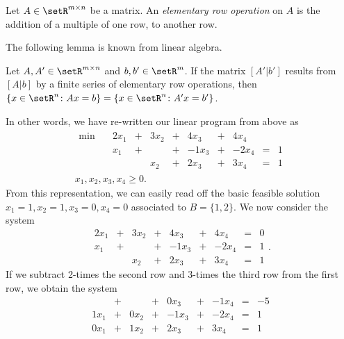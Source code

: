 \begin{definition}
  \label{def:14}
  Let $A\in \setR^{m\times n}$ be a matrix. An \emph{elementary row operation}
  on $A$ is the addition of a multiple of one row, to another row. 
\end{definition}

The following lemma is known from linear algebra. 
\begin{lemma}
  \label{lem:12}
  Let $A,A' \in \setR^{m\times n}$ and $b , b' \in \setR^m$. If the matrix
  $\left[A'|b'\right]$ results from  $\left[A|b\right]$ by a finite
  series of elementary row operations, then  $\{x \in  \setR^n \colon Ax=b\} =
  \{x \in  \setR^n \colon A'x=b'\}$. 
\end{lemma}

\noindent 
In other words, we have re-written our linear program from above as 
\begin{displaymath}
 \begin{array}{r}
  \begin{matrix}               
    \min \quad  & 2 x_1 & + & 3 x_2 & +&  4 x_3 & +&  4 x_4  & & \\
 &      x_1   & + &     & + & -1 x_3 & + & -2x_4 & = & 1    
    \\                          
&    &   &  x_2 & + & 2 x_3 & + & 3 x_4 & =&  1 
  \end{matrix} \\
  x_1,x_2,x_3,x_4 \geq0. 
\end{array}
\end{displaymath}  
From this representation, we can easily read off the basic feasible
solution $x_1=1, x_2=1, x_3 = 0, x_4 = 0$ associated to $B =
\{1,2\}$. We now consider the system
\begin{displaymath}
   \begin{matrix}               
    2 x_1 & + & 3 x_2 & +&  4 x_3 & +&  4 x_4  & =  & 0 \\
    \hline
      x_1   & + &     & + & -1 x_3 & + & -2x_4 & = & 1    
    \\                          
    &   &  x_2 & + & 2 x_3 & + & 3 x_4 & =&  1 
  \end{matrix}. 
\end{displaymath}
If we subtract 2-times the second row and 3-times the third row from
the first row, we obtain the system 
\begin{displaymath}
  \begin{matrix}    
 & + &       & + &     0 x_3 & + &    -1x_4 & = &
-5\\ \hline 
1  x_1 & + &    0 x_2 & + &   -1x_3 & + &    -2 x_4 & = &    1\\
     0x_1 & + &     1x_2 & + &     2x_3& + &     3x_4 & = &     1
   \end{matrix}                             
\end{displaymath}
